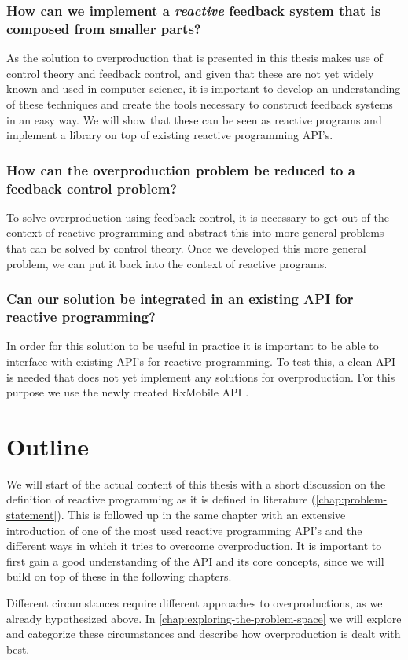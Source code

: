 \subsubsection*{How can we implement a \emph{reactive} feedback system that is composed from smaller parts?} 
As the solution to overproduction that is presented in this thesis makes use of control theory and feedback control, and given that these are not yet widely known and used in computer science, it is important to develop an understanding of these techniques and create the tools necessary to construct feedback systems in an easy way. We will show that these can be seen as reactive programs and implement a library on top of existing reactive programming API's.

\subsubsection*{How can the overproduction problem be reduced to a feedback control problem?}
To solve overproduction using feedback control, it is necessary to get out of the context of reactive programming and abstract this into more general problems that can be solved by control theory. Once we developed this more general problem, we can put it back into the context of reactive programs.

\subsubsection*{Can our solution be integrated in an existing API for reactive programming?}
In order for this solution to be useful in practice it is important to be able to interface with existing API's for reactive programming. To test this, a clean API is needed that does not yet implement any solutions for overproduction. For this purpose we use the newly created RxMobile API \cite{RxMobile}.

\section*{Outline}
We will start of the actual content of this thesis with a short discussion on the definition of reactive programming as it is defined in literature (\autoref{chap:problem-statement}). This is followed up in the same chapter with an extensive introduction of one of the most used reactive programming API's and the different ways in which it tries to overcome overproduction. It is important to first gain a good understanding of the API and its core concepts, since we will build on top of these in the following chapters.

Different circumstances require different approaches to overproductions, as we already hypothesized above. In \autoref{chap:exploring-the-problem-space} we will explore and categorize these circumstances and describe how overproduction is dealt with best.

